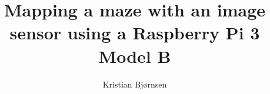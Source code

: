 \title{Mapping a maze with an image sensor using a Raspberry Pi 3 Model B}


\author{Kristian Bjørnsen}